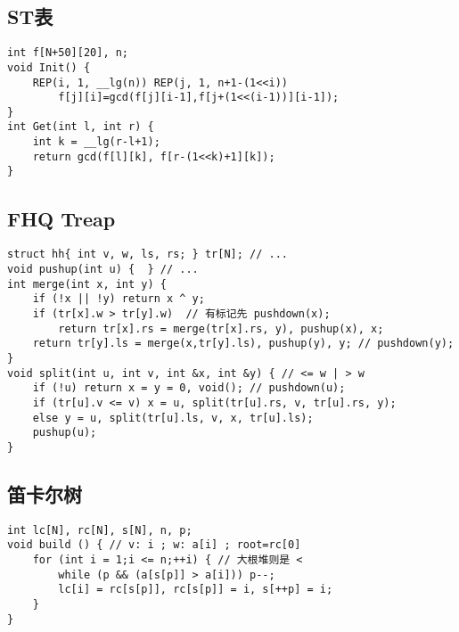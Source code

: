 \documentclass[a4paper,landscape,twocolumn]{ctexart}
\begin{document}
\subsection{ST表}

\begin{lstlisting}
int f[N+50][20], n;
void Init() {
	REP(i, 1, __lg(n)) REP(j, 1, n+1-(1<<i))
		f[j][i]=gcd(f[j][i-1],f[j+(1<<(i-1))][i-1]);
}
int Get(int l, int r) {
	int k = __lg(r-l+1);
	return gcd(f[l][k], f[r-(1<<k)+1][k]);
}
\end{lstlisting}

\subsection{FHQ \space Treap}

\begin{lstlisting}
struct hh{ int v, w, ls, rs; } tr[N]; // ...
void pushup(int u) {  } // ...
int merge(int x, int y) {
	if (!x || !y) return x ^ y;
	if (tr[x].w > tr[y].w)  // 有标记先 pushdown(x);
		return tr[x].rs = merge(tr[x].rs, y), pushup(x), x;
	return tr[y].ls = merge(x,tr[y].ls), pushup(y), y; // pushdown(y);
}
void split(int u, int v, int &x, int &y) { // <= w | > w
	if (!u) return x = y = 0, void(); // pushdown(u);
	if (tr[u].v <= v) x = u, split(tr[u].rs, v, tr[u].rs, y);
	else y = u, split(tr[u].ls, v, x, tr[u].ls);
	pushup(u);
}
\end{lstlisting}

\subsection{笛卡尔树}

\begin{lstlisting}
int lc[N], rc[N], s[N], n, p;
void build () { // v: i ; w: a[i] ; root=rc[0]
	for (int i = 1;i <= n;++i) { // 大根堆则是 <
		while (p && (a[s[p]] > a[i])) p--;
		lc[i] = rc[s[p]], rc[s[p]] = i, s[++p] = i;
	}
}
\end{lstlisting}
\end{document}
